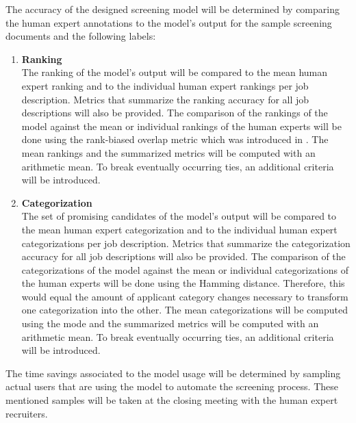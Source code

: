 \documentclass[draft,final]{thesisclass} %
\begin{document}
The accuracy of the designed screening model will be determined by comparing the human expert annotations to the model's output for the sample screening documents and the following labels:
\begin{enumerate}
    \item \textbf{Ranking}\\
    The ranking of the model's output will be compared to the mean human expert ranking and to the individual human expert rankings per job description.
    Metrics that summarize the ranking accuracy for all job descriptions will also be provided.
    The comparison of the rankings of the model against the mean or individual rankings of the human experts will be done using the rank-biased overlap metric which was introduced in \textcite{rank_biased_overlap}. 
    The mean rankings and the summarized metrics will be computed with an arithmetic mean.
    To break eventually occurring ties, an additional criteria will be introduced.
    \item \textbf{Categorization}\\
    The set of promising candidates of the model's output will be compared to the mean human expert categorization and to the individual human expert categorizations per job description.
    Metrics that summarize the categorization accuracy for all job descriptions will also be provided.
    The comparison of the categorizations of the model against the mean or individual categorizations of the human experts will be done using the Hamming distance.
    Therefore, this would equal the amount of applicant category changes necessary to transform one categorization into the other.
    The mean categorizations will be computed using the mode and the summarized metrics will be computed with an arithmetic mean.
    To break eventually occurring ties, an additional criteria will be introduced.
\end{enumerate}

The time savings associated to the model usage will be determined by sampling actual users that are using the model to automate the screening process.
These mentioned samples will be taken at the closing meeting with the human expert recruiters.
\end{document}
